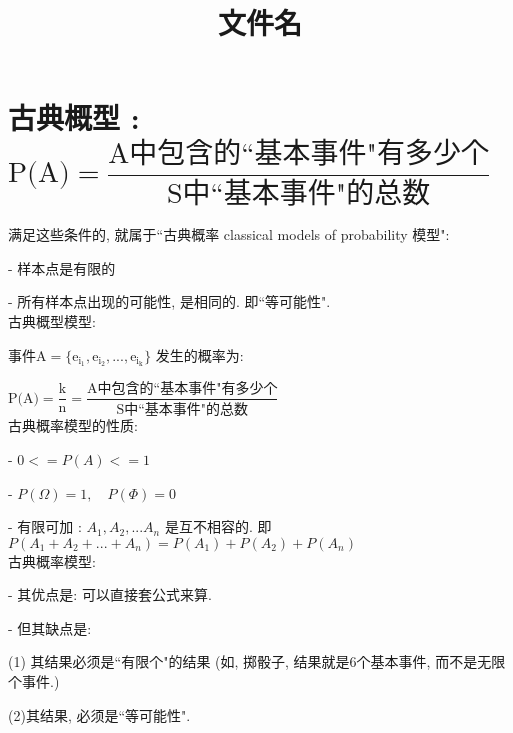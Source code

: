 \documentclass[UTF8]{ctexart}
\title{文件名}
\begin{document}
	\tableofcontents %
	\date{} %
	\maketitle  %
	
	
	
	
	\part{古典概型 : $\boxed{
		\text{P(A)}=\dfrac{\text{A中包含的``基本事件"有多少个}}{\text{S中``基本事件"的总数}}}$}
	
	
	满足这些条件的, 就属于``古典概率  classical models of probability 模型":
	
	- 样本点是有限的
	
	- 所有样本点出现的可能性, 是相同的. 即``等可能性". \\
	
	
	古典概型模型:
	
	事件$\text{A}=\{\text{e}_{\text{i}_1},\text{e}_{\text{i}_2},...,\text{e}_{\text{i}_{\text{k}}}\}$ 发生的概率为:
	
	$
	\text{P(A)}=\dfrac{\text{k}}{\text{n}}=\dfrac{\text{A中包含的``基本事件"有多少个}}{\text{S中``基本事件"的总数}}
	$ \\
	
	
	古典概率模型的性质:
	
	- $0 <= P(A) <= 1$
	
	- $P(\Omega)=1, \quad  P(\Phi)=0$
	
	- 有限可加 : $ A_1, A_2, ... A_n$ 是互不相容的. 即 $P(A_1 +A_2 + ...+ A_n)= P(A_1) +  P(A_2)  + P(A_n)$ \\
	
	古典概率模型: 
	
	- 其优点是: 可以直接套公式来算. 
	
	- 但其缺点是: 
	
	(1) 其结果必须是``有限个"的结果 (如, 掷骰子, 结果就是6个基本事件, 而不是无限个事件.) 
	
	(2)其结果, 必须是``等可能性". \\
	
	
	
\end{document}
